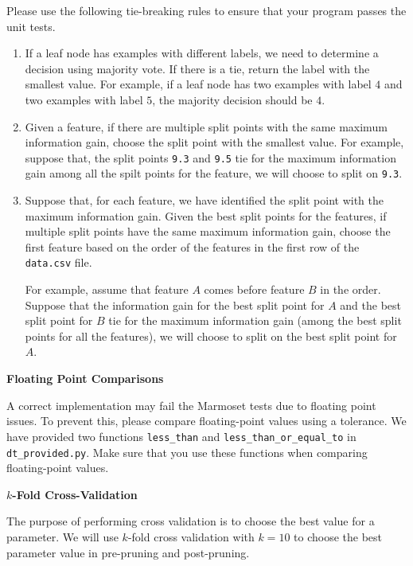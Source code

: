 \documentclass[12pt]{article}
\begin{document}
Please use the following tie-breaking rules to ensure that your program passes the unit tests.
\begin{enumerate}[1]
\item 
If a leaf node has examples with different labels, we need to determine a decision using majority vote. If there is a tie, return the label with the smallest value. For example, if a leaf node has two examples with label $4$ and two examples with label $5$, the majority decision should be $4$.

\item
Given a feature, if there are multiple split points with the same maximum information gain, choose the split point with the smallest value. For example, suppose that, the split points \verb+9.3+ and \verb+9.5+ tie for the maximum information gain among all the spilt points for the feature, we will choose to split on \verb+9.3+.

\item
Suppose that, for each feature, we have identified the split point with the maximum information gain. Given the best split points for the features, if multiple split points have the same maximum information gain, choose the first feature based on the order of the features in the first row of the \verb+data.csv+ file. 

For example, assume that feature $A$ comes before feature $B$ in the order. Suppose that the information gain for the best split point for $A$ and the best split point for $B$ tie for the maximum information gain (among the best split points for all the features), we will choose to split on the best split point for $A$.

\end{enumerate}

{\bf Floating Point Comparisons}

A correct implementation may fail the Marmoset tests due to floating point issues. To prevent this, please compare floating-point values using a tolerance. We have provided two functions \verb+less_than+ and \verb+less_than_or_equal_to+ in \verb+dt_provided.py+. Make sure that you use these functions when comparing floating-point values.

{\bf $k$-Fold Cross-Validation}

The purpose of performing cross validation is to choose the best value for a parameter. We will use $k$-fold cross validation with $k=10$ to choose the best parameter value in pre-pruning and post-pruning. 
\end{document}
